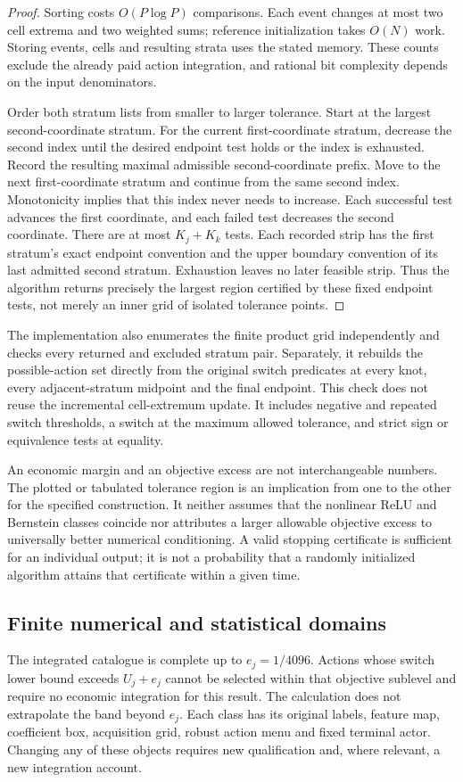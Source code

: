 \begin{proof}
Sorting costs $O(P\log P)$ comparisons. Each event changes at most two cell extrema and two weighted sums; reference initialization takes $O(N)$ work. Storing events, cells and resulting strata uses the stated memory. These counts exclude the already paid action integration, and rational bit complexity depends on the input denominators.

Order both stratum lists from smaller to larger tolerance. Start at the largest second-coordinate stratum. For the current first-coordinate stratum, decrease the second index until the desired endpoint test holds or the index is exhausted. Record the resulting maximal admissible second-coordinate prefix. Move to the next first-coordinate stratum and continue from the same second index. Monotonicity implies that this index never needs to increase. Each successful test advances the first coordinate, and each failed test decreases the second coordinate. There are at most $K_j+K_k$ tests. Each recorded strip has the first stratum's exact endpoint convention and the upper boundary convention of its last admitted second stratum. Exhaustion leaves no later feasible strip. Thus the algorithm returns precisely the largest region certified by these fixed endpoint tests, not merely an inner grid of isolated tolerance points.
\end{proof}

The implementation also enumerates the finite product grid independently and checks every returned and excluded stratum pair. Separately, it rebuilds the possible-action set directly from the original switch predicates at every knot, every adjacent-stratum midpoint and the final endpoint. This check does not reuse the incremental cell-extremum update. It includes negative and repeated switch thresholds, a switch at the maximum allowed tolerance, and strict sign or equivalence tests at equality.

An economic margin and an objective excess are not interchangeable numbers. The plotted or tabulated tolerance region is an implication from one to the other for the specified construction. It neither assumes that the nonlinear ReLU and Bernstein classes coincide nor attributes a larger allowable objective excess to universally better numerical conditioning. A valid stopping certificate is sufficient for an individual output; it is not a probability that a randomly initialized algorithm attains that certificate within a given time.

\subsection{Finite numerical and statistical domains}
The integrated catalogue is complete up to $e_j=1/4096$. Actions whose switch lower bound exceeds $U_j+e_j$ cannot be selected within that objective sublevel and require no economic integration for this result. The calculation does not extrapolate the band beyond $e_j$. Each class has its original labels, feature map, coefficient box, acquisition grid, robust action menu and fixed terminal actor. Changing any of these objects requires new qualification and, where relevant, a new integration account.


